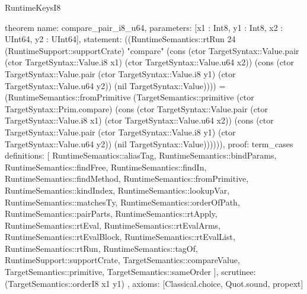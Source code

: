 \begin{lexlean}{RuntimeKeysI8}
\begin{semanticmodule}
theorem{
  name: compare_pair_i8_u64,
  parameters: [x1 : Int8, y1 : Int8, x2 : UInt64, y2 : UInt64],
  statement: ((RuntimeSemantics::rtRun 24 (RuntimeSupport::supportCrate) "compare" (cons (ctor TargetSyntax::Value.pair (ctor TargetSyntax::Value.i8 x1) (ctor TargetSyntax::Value.u64 x2)) (cons (ctor TargetSyntax::Value.pair (ctor TargetSyntax::Value.i8 y1) (ctor TargetSyntax::Value.u64 y2)) (nil TargetSyntax::Value)))) = (RuntimeSemantics::fromPrimitive (TargetSemantics::primitive (ctor TargetSyntax::Prim.compare) (cons (ctor TargetSyntax::Value.pair (ctor TargetSyntax::Value.i8 x1) (ctor TargetSyntax::Value.u64 x2)) (cons (ctor TargetSyntax::Value.pair (ctor TargetSyntax::Value.i8 y1) (ctor TargetSyntax::Value.u64 y2)) (nil TargetSyntax::Value)))))),
  proof: term_cases{
    definitions: [
      RuntimeSemantics::aliasTag,
      RuntimeSemantics::bindParams,
      RuntimeSemantics::findFree,
      RuntimeSemantics::findIn,
      RuntimeSemantics::findMethod,
      RuntimeSemantics::fromPrimitive,
      RuntimeSemantics::kindIndex,
      RuntimeSemantics::lookupVar,
      RuntimeSemantics::matchesTy,
      RuntimeSemantics::orderOfPath,
      RuntimeSemantics::pairParts,
      RuntimeSemantics::rtApply,
      RuntimeSemantics::rtEval,
      RuntimeSemantics::rtEvalArms,
      RuntimeSemantics::rtEvalBlock,
      RuntimeSemantics::rtEvalList,
      RuntimeSemantics::rtRun,
      RuntimeSemantics::tagOf,
      RuntimeSupport::supportCrate,
      TargetSemantics::compareValue,
      TargetSemantics::primitive,
      TargetSemantics::sameOrder
    ],
    scrutinee: (TargetSemantics::orderI8 x1 y1)
  },
  axioms: [Classical.choice, Quot.sound, propext]
}


\end{semanticmodule}
\end{lexlean}

